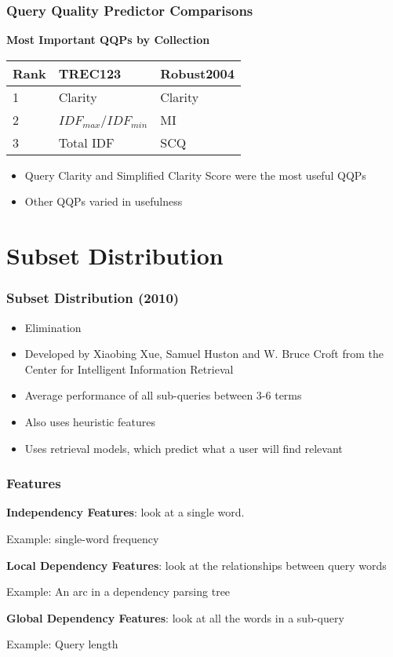 \documentclass{beamer}
\begin{document}
\begin{frame}[fragile]\frametitle{Query Quality Predictor Comparisons}
\begin{center}
\textbf{Most Important QQPs by Collection} \vspace*{.5cm}
\begin{tabular}{| l | p{3cm} | p{3cm} |}
\hline
\small{\textbf{Rank}} & \small{\textbf{TREC123}} & \small{\textbf{Robust2004}} \\ \hline
1 & Clarity & Clarity \\ \hline 
2 & $IDF_{max}$/$IDF_{min}$ & MI \\ \hline
3 & Total IDF & SCQ \\
\hline
\end{tabular}
\end{center} \vspace*{.5cm}
\begin{itemize}
\item Query Clarity and Simplified Clarity Score were the most useful QQPs
\item Other QQPs varied in usefulness
\end{itemize}
\end{frame}

\section{Subset Distribution}

\begin{frame}[fragile]\frametitle{Subset Distribution (2010)}
\begin{itemize}
\item Elimination \pause
\item Developed by Xiaobing Xue, Samuel Huston and W. Bruce Croft from the Center for
Intelligent Information Retrieval \pause
\item Average performance of all sub-queries between 3-6 terms \pause
\item Also uses heuristic features \pause
\item Uses retrieval models, which predict what a user will find relevant
\end{itemize}
\end{frame}

\begin{frame}[fragile]\frametitle{Features}
\textbf{Independency Features}: look at a single word. \pause

Example: single-word frequency \vspace*{.5cm} \pause

\textbf{Local Dependency Features}: look at the relationships between
query words \pause

Example: An arc in a dependency parsing tree \vspace*{.5cm} \pause

\textbf{Global Dependency Features}: look at all the words in a sub-query \pause

Example: Query length
\end{frame}
\end{document}
